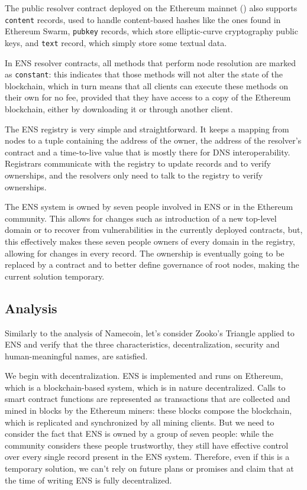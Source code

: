 \documentclass[mscthesis]{usiinfthesis}
\begin{document}
The public resolver contract deployed on the Ethereum mainnet (\cite{enspublicresolver}) also supports \texttt{content} records, used to handle content-based hashes like the ones found in Ethereum Swarm, \texttt{pubkey} records, which store elliptic-curve cryptography public keys, and \texttt{text} record, which simply store some textual data.

In ENS resolver contracts, all methods that perform node resolution are marked as \texttt{constant}: this indicates that those methods will not alter the state of the blockchain, which in turn means that all clients can execute these methods on their own for no fee, provided that they have access to a copy of the Ethereum blockchain, either by downloading it or through another client.

The ENS registry is very simple and straightforward. It keeps a mapping from nodes to a tuple containing the address of the owner, the address of the resolver's contract and a time-to-live value that is mostly there for DNS interoperability. Registrars communicate with the registry to update records and to verify ownerships, and the resolvers only need to talk to the registry to verify ownerships.

The ENS system is owned by seven people involved in ENS or in the Ethereum community. This allows for changes such as introduction of a new top-level domain or to recover from vulnerabilities in the currently deployed contracts, but, this effectively makes these seven people owners of every domain in the registry, allowing for changes in every record. The ownership is eventually going to be replaced by a contract and to better define governance of root nodes, making the current solution temporary. %

\subsection{Analysis}

Similarly to the analysis of Namecoin, let's consider Zooko's Triangle applied to ENS and verify that the three characteristics, decentralization, security and human-meaningful names, are satisfied.

We begin with decentralization. ENS is implemented and runs on Ethereum, which is a blockchain-based system, which is in nature decentralized. Calls to smart contract functions are represented as transactions that are collected and mined in blocks by the Ethereum miners: these blocks compose the blockchain, which is replicated and synchronized by all mining clients. But we need to consider the fact that ENS is owned by a group of seven people: while the community considers these people trustworthy, they still have effective control over every single record present in the ENS system. Therefore, even if this is a temporary solution, we can't rely on future plans or promises and claim that at the time of writing ENS is fully decentralized.
\end{document}
